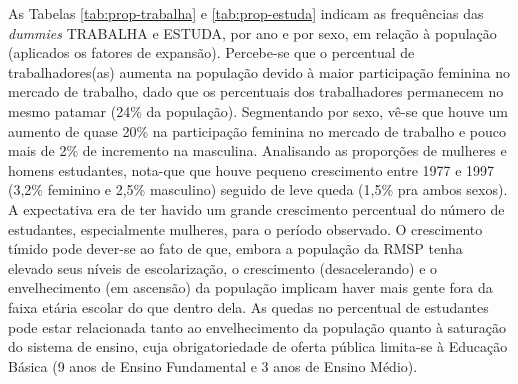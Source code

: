 
As Tabelas \ref{tab:prop-trabalha} e \ref{tab:prop-estuda} indicam as frequências das \textit{dummies} TRABALHA e ESTUDA, por ano e por sexo, em relação à população (aplicados os fatores de expansão).
Percebe-se que o percentual de trabalhadores(as) aumenta na população devido à maior participação feminina no mercado de trabalho, dado que os percentuais dos trabalhadores permanecem no mesmo patamar (24\% da população). Segmentando por sexo, vê-se que houve um aumento de quase 20\% na participação feminina no mercado de trabalho e pouco mais de 2\% de incremento na masculina.
Analisando as proporções de mulheres e homens estudantes, nota-que que houve pequeno crescimento entre 1977 e 1997 (3,2\% feminino e 2,5\% masculino) seguido de leve queda (1,5\% pra ambos sexos). A expectativa era de ter havido um grande crescimento percentual do número de estudantes, especialmente mulheres, para o período observado. O crescimento tímido pode dever-se ao fato de que, embora a população da RMSP tenha elevado seus níveis de escolarização, o crescimento (desacelerando) e o envelhecimento (em ascensão) da população implicam haver mais gente fora da faixa etária escolar do que dentro dela. As quedas no percentual de estudantes pode estar relacionada tanto ao envelhecimento da população quanto à saturação do sistema de ensino, cuja obrigatoriedade de oferta pública limita-se à Educação Básica (9 anos de Ensino Fundamental e 3 anos de Ensino Médio). 


\begin{table}[htb]

\end{table}

